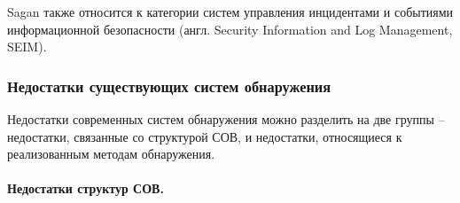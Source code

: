 Sagan также относится к категории систем управления инцидентами и событиями информационной
безопасности (англ. Security Information and Log Management, SEIM).

\subsubsection{Недостатки существующих систем обнаружения}

Недостатки современных систем обнаружения можно разделить на две группы – недостатки, связанные со структурой СОВ, и недостатки, относящиеся к реализованным методам обнаружения.

\paragraph*{Недостатки структур СОВ.}

